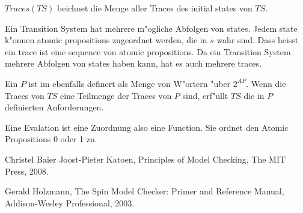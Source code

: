 \documentclass[11pt,twoside,a4paper]{article}
\begin{document}
$Traces(TS)$ beichnet die Menge aller Traces des initial states von $TS$.

 Ein Transition System hat mehrere m"ogliche Abfolgen von states. Jedem state k"onnen atomic propositions zugeordnet werden, die in $s$ wahr sind. Dass heisst ein trace ist eine sequence von atomic propositions. Da ein Transition System mehrere Abfolgen von states haben kann, hat es auch mehrere traces.

Ein $P$ ist im ebenfalls definert als Menge von W"ortern "uber $2^{AP}$. Wenn die Traces von $TS$ eine Teilmenge der Traces von $P$ sind, erf"ullt $TS$ die in $P$ definierten Anforderungen.

Eine Evalation ist eine Zuordnung also eine Function. Sie ordnet den Atomic Propositions 0 oder 1 zu. 





\begin{thebibliography}{9}
Christel Baier Joost-Pieter Katoen,
Principles of Model Checking,
The MIT Press,
2008.

Gerald Holzmann,
The Spin Model Checker: Primer and Reference Manual,
Addison-Wesley Professional,
2003.
\end{thebibliography}
\end{document}
